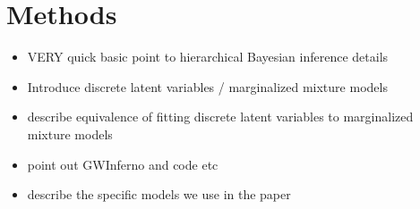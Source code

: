 \section{Methods} \label{sec:methods}

\begin{itemize}
    \item VERY quick basic point to hierarchical Bayesian inference details
    \item Introduce discrete latent variables / marginalized mixture models
    \item describe equivalence of fitting discrete latent variables to marginalized mixture models
    \item point out GWInferno and code etc
    \item describe the specific models we use in the paper
\end{itemize}
